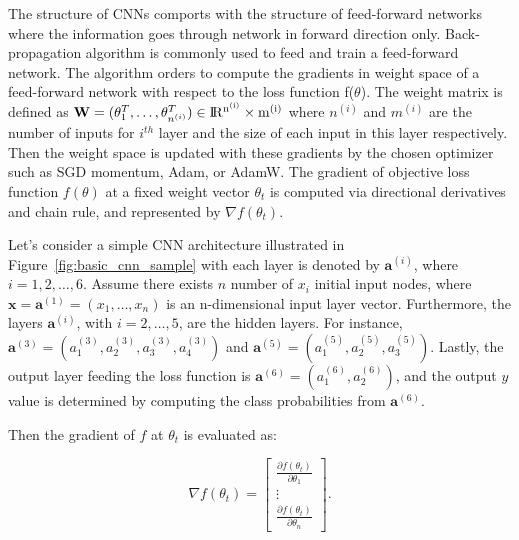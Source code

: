 The structure of CNNs comports with the structure of feed-forward networks where the information goes through network in forward direction only. Back-propagation algorithm is commonly used to feed and train a feed-forward network. The algorithm orders to compute the gradients in weight space of a feed-forward network with respect to the loss function f(\textbf{$\theta$}). The weight matrix is defined as $\textbf{W} =(\theta_{1}^{T}, \dots ,\theta_{n^{(i)}}^{T}) \in \rm I\!R^{n^{(i)}} \times m^{(i)}$ where $n^{(i)}$ and $m^{(i)}$ are the number of inputs for $i^{th}$ layer and the size of each input in this layer respectively. Then the weight space is updated with these gradients by the chosen optimizer such as SGD momentum, Adam, or AdamW. The gradient of objective loss function $f(\textbf{$\theta$})$ at a fixed weight vector \textbf{$\theta_{t}$} is computed via directional derivatives and chain rule, and represented by $\nabla f(\textbf{$\theta_{t}$})$.

Let's consider a simple CNN architecture illustrated in Figure~\ref{fig:basic_cnn_sample} with each layer is denoted by    
$\textbf{a}^{(i)}$,  where $i=1,2, \ldots, 6$. Assume there exists $n$ number of $x_{i}$ initial input nodes, where $\textbf{x} = \textbf{a}^{(1)} = (x_{1}, \dots , x_{n})$ is an n-dimensional input layer vector. 
Furthermore, the layers $\textbf{a}^{(i)}$, with $i=2, \ldots, 5$, are the hidden layers. For instance, $\textbf{a}^{(3)} = (a_{1}^{(3)}, a_{2}^{(3)}, a_{3}^{(3)}, a_{4}^{(3)})$ and $\textbf{a}^{(5)} = (a_{1}^{(5)}, a_{2}^{(5)}, a_{3}^{(5)})$. Lastly, the output layer feeding the loss function is $\textbf{a}^{(6)} = (a_{1}^{(6)}, a_{2}^{(6)})$, and the output $y$ value is determined by computing the class probabilities from $\textbf{a}^{(6)}$.
 
Then the gradient of $f$ at $\theta_{t}$ is evaluated as:

\begin{equation}
\nabla f (\theta_{t}) = 
    \begin{bmatrix}
        \frac { \partial f (\theta_{t})} {\partial \theta_{1}}\\
        \vdots \\
        \frac { \partial f (\theta_{t})} {\partial \theta_{n}}
    \end{bmatrix}.    
\end{equation} 

